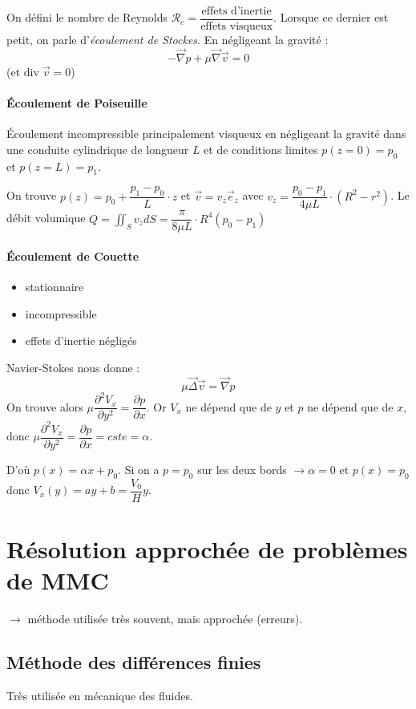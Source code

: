 \documentclass{article}
\begin{document}
On défini le nombre de Reynolds $\mathcal{R}_e = \dfrac{\text{effets d'inertie}}{\text{effets visqueux}}$. Lorsque ce dernier est petit, on parle d'\emph{écoulement de Stockes}. En négligeant la gravité :
\[-\vec{\nabla}p+\mu\vec{\nabla}\vec{v}=0\]
(et $\text{div}\; \vec{v}=0$)


\paragraph{Écoulement de Poiseuille}
Écoulement incompressible principalement visqueux en négligeant la gravité dans une conduite cylindrique de longueur $L$ et de conditions limites $p(z=0)=p_0$ et $p(z=L)=p_1$.

On trouve $p(z)= p_0 + \dfrac{p_1-p_0}{L}\cdot z$ et $\vec{v}=v_z \vec{e}_z$ avec $v_z=\dfrac{p_0-p_1}{4\mu L}\cdot (R^2-r^2)$. Le débit volumique $Q=\iint_{S} v_z dS = \dfrac{\pi}{8\mu L}\cdot R^4 (p_0-p_1)$

\paragraph{Écoulement de Couette}
\begin{itemize}[label=$\star$]
\item stationnaire
\item incompressible
\item effets d'inertie négligés
\end{itemize}

Navier-Stokes nous donne :
\[\mu \vec{\Delta}\vec{v} = \vec{\nabla}p\]
On trouve alors $\mu \dfrac{\partial^2 V_x}{\partial y ^2}=\dfrac{\partial p}{\partial x}$. Or $V_x$ ne dépend que de $y$ et $p$ ne dépend que de $x$, donc $\mu \dfrac{\partial^2 V_x}{\partial y ^2}=\dfrac{\partial p}{\partial x} = cste = \alpha$.

D'où $p(x) = \alpha x +p_0$. Si on a $p=p_0$ sur les deux bords $\to \alpha = 0$ et $p(x)=p_0$ donc $V_x(y)=ay+b = \dfrac{V_0}{H}y$.


\section{Résolution approchée de problèmes de MMC}
$\to$ méthode utilisée très souvent, mais approchée (erreurs).

\subsection{Méthode des différences finies}
Très utilisée en mécanique des fluides.
\end{document}
